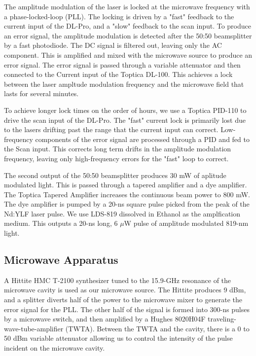 \documentclass[aps,pra,preprint,groupedaddress]{revtex4-1}
\begin{document}
The amplitude modulation of the laser is locked at the microwave frequency with a phase-locked-loop (PLL). The locking is driven by a "fast" feedback to the current input of the DL-Pro, and a "slow" feedback to the scan input. To produce an error signal, the amplitude modulation is detected after the 50:50 beamsplitter by a fast photodiode. The DC signal is filtered out, leaving only the AC component. This is amplified and mixed with the microwave source to produce an error signal. The error signal is passed through a variable attenuator and then connected to the Current input of the Toptica DL-100. This achieves a lock between the laser ampltude modulation frequency and the microwave field that lasts for several minutes.

To achieve longer lock times on the order of hours, we use a Toptica PID-110 to drive the scan input of the DL-Pro. The "fast" current lock is primarily lost due to the lasers drifting past the range that the current input can correct. Low-frequency components of the error signal are processed through a PID and fed to the Scan input. This corrects long term drifts in the amplitude modulation frequency, leaving only high-frequency errors for the "fast" loop to correct.

The second output of the 50:50 beamsplitter produces 30 mW of aplitude modulated light. This is passed through a tapered amplifier and a dye amplifier. The Toptica Tapered Amplifier increases the continuous beam power to 800 mW. The dye amplifier is pumped by a 20-ns square pulse picked from the peak of the Nd:YLF laser pulse. We use LDS-819 dissolved in Ethanol as the amplfication medium. This outputs a 20-ns long, 6 $\mu$W pulse of amplitude modulated 819-nm light.

\subsection{\label{cavity} Microwave Apparatus}

A Hittite HMC T-2100 synthesizer tuned to the 15.9-GHz resonance of the microwave cavity is used as our microwave source. The Hittite produces 9 dBm, and a splitter diverts half of the power to the microwave mixer to generate the error signal for the PLL. The other half of the signal is formed into 300-ns pulses by a microwave switch, and then amplified by a Hughes 8020H04F traveling-wave-tube-amplifier (TWTA). Between the TWTA and the cavity, there is a 0 to 50 dBm variable attenuator allowing us to control the intensity of the pulse incident on the microwave cavity.
\end{document}
